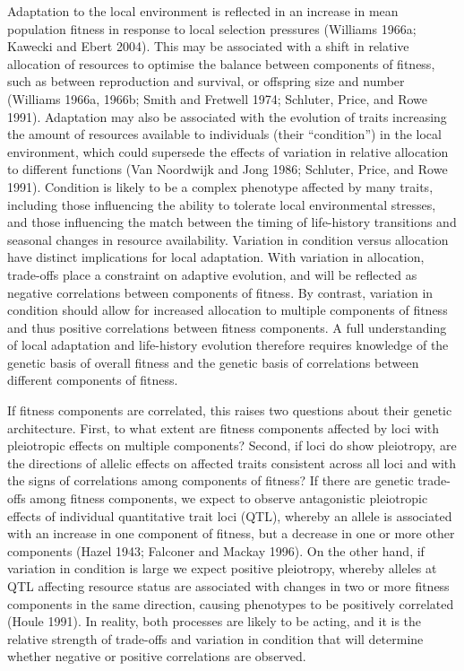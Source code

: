 \documentclass[]{article}
\begin{document}
Adaptation to the local environment is reflected in an increase in mean population fitness in response to local selection pressures (Williams 1966a; Kawecki and Ebert 2004). This may be associated with a shift in relative allocation of resources to optimise the balance between components of fitness, such as between reproduction and survival, or offspring size and number (Williams 1966a, 1966b; Smith and Fretwell 1974; Schluter, Price, and Rowe 1991). Adaptation may also be associated with the evolution of traits increasing the amount of resources available to individuals (their ``condition'') in the local environment, which could supersede the effects of variation in relative allocation to different functions (Van Noordwijk and Jong 1986; Schluter, Price, and Rowe 1991). Condition is likely to be a complex phenotype affected by many traits, including those influencing the ability to tolerate local environmental stresses, and those influencing the match between the timing of life-history transitions and seasonal changes in resource availability. Variation in condition versus allocation have distinct implications for local adaptation. With variation in allocation, trade-offs place a constraint on adaptive evolution, and will be reflected as negative correlations between components of fitness. By contrast, variation in condition should allow for increased allocation to multiple components of fitness and thus positive correlations between fitness components. A full understanding of local adaptation and life-history evolution therefore requires knowledge of the genetic basis of overall fitness and the genetic basis of correlations between different components of fitness.

If fitness components are correlated, this raises two questions about their genetic architecture. First, to what extent are fitness components affected by loci with pleiotropic effects on multiple components? Second, if loci do show pleiotropy, are the directions of allelic effects on affected traits consistent across all loci and with the signs of correlations among components of fitness? If there are genetic trade-offs among fitness components, we expect to observe antagonistic pleiotropic effects of individual quantitative trait loci (QTL), whereby an allele is associated with an increase in one component of fitness, but a decrease in one or more other components (Hazel 1943; Falconer and Mackay 1996). On the other hand, if variation in condition is large we expect positive pleiotropy, whereby alleles at QTL affecting resource status are associated with changes in two or more fitness components in the same direction, causing phenotypes to be positively correlated (Houle 1991). In reality, both processes are likely to be acting, and it is the relative strength of trade-offs and variation in condition that will determine whether negative or positive correlations are observed.
\end{document}
